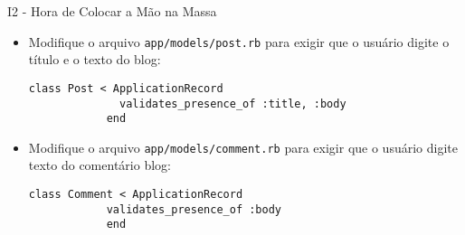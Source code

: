 \begin{frame}{I2 - Hora de Colocar a Mão na Massa}
	\begin{itemize}
			
		\item Modifique o arquivo \verb|app/models/post.rb| para exigir 
			que o usuário digite o título e o texto do blog:
		\begin{lstlisting}[style=RubyInputStyle]
			class Post < ApplicationRecord
			  validates_presence_of :title, :body
			end
		\end{lstlisting}
		
		\item Modifique o arquivo \verb|app/models/comment.rb| para exigir 
		que o usuário digite texto do comentário blog:
		\begin{lstlisting}[style=RubyInputStyle]
			class Comment < ApplicationRecord
		    validates_presence_of :body
			end
		\end{lstlisting}
		
	\end{itemize}
\end{frame}